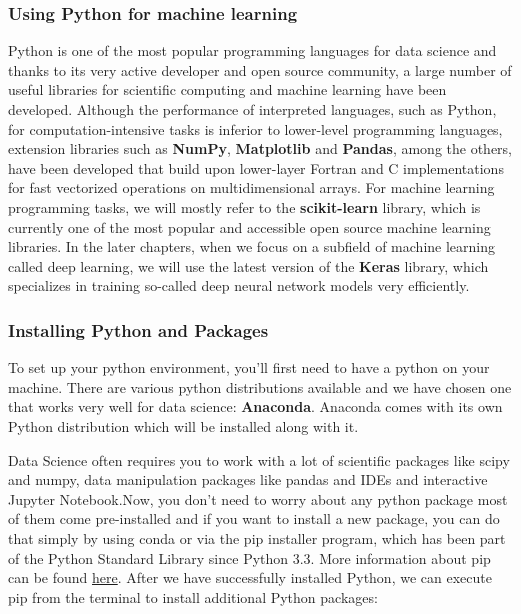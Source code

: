 \documentclass[11pt]{article}
\begin{document}
    \hypertarget{using-python-for-machine-learning}{%
\subsubsection{Using Python for machine
learning}\label{using-python-for-machine-learning}}

    Python is one of the most popular programming languages for data science
and thanks to its very active developer and open source community, a
large number of useful libraries for scientific computing and machine
learning have been developed. Although the performance of interpreted
languages, such as Python, for computation-intensive tasks is inferior
to lower-level programming languages, extension libraries such as
\textbf{NumPy}, \textbf{Matplotlib} and \textbf{Pandas}, among the
others, have been developed that build upon lower-layer Fortran and C
implementations for fast vectorized operations on multidimensional
arrays. For machine learning programming tasks, we will mostly refer to
the \textbf{scikit-learn} library, which is currently one of the most
popular and accessible open source machine learning libraries. In the
later chapters, when we focus on a subfield of machine learning called
deep learning, we will use the latest version of the \textbf{Keras}
library, which specializes in training so-called deep neural network
models very efficiently.

    \hypertarget{installing-python-and-packages}{%
\subsubsection{Installing Python and
Packages}\label{installing-python-and-packages}}

    To set up your python environment, you'll first need to have a python on
your machine. There are various python distributions available and we
have chosen one that works very well for data science:
\textbf{Anaconda}. Anaconda comes with its own Python distribution which
will be installed along with it.

Data Science often requires you to work with a lot of scientific
packages like scipy and numpy, data manipulation packages like pandas
and IDEs and interactive Jupyter Notebook.Now, you don't need to worry
about any python package most of them come pre-installed and if you want
to install a new package, you can do that simply by using conda or via
the pip installer program, which has been part of the Python Standard
Library since Python 3.3. More information about pip can be found
\href{https://docs.python.org/3/installing/index.html}{here}. After we
have successfully installed Python, we can execute pip from the terminal
to install additional Python packages:
\end{document}
